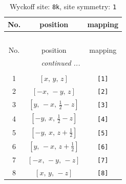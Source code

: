 \documentclass[fleqn,8pt]{jsarticle}
\begin{document}
\renewcommand{\arraystretch}{1.2}
\begin{longtable}{ccc}
\caption{Wyckoff site: {\tt 8k}, site symmetry: {\tt 1}}
 \\
 \hline \hline
No. & position & mapping \\ \hline \endfirsthead

\multicolumn{2}{l}{\tablename\ \thetable{}} \\
 \hline \hline
No. & position & mapping \\ \hline \endhead

 \hline \hline
\multicolumn{2}{r}{\footnotesize\it continued ...} \\ \endfoot

 \hline \hline
\multicolumn{2}{r}{} \\ \endlastfoot

1 & $\left[ x,\, y,\, z \right]$ & {\tt [1]} \\ \hline
2 & $\left[ - x,\, - y,\, z \right]$ & {\tt [2]} \\ \hline
3 & $\left[ y,\, - x,\, \frac{1}{2} - z \right]$ & {\tt [3]} \\ \hline
4 & $\left[ - y,\, x,\, \frac{1}{2} - z \right]$ & {\tt [4]} \\ \hline
5 & $\left[ - y,\, x,\, z + \frac{1}{2} \right]$ & {\tt [5]} \\ \hline
6 & $\left[ y,\, - x,\, z + \frac{1}{2} \right]$ & {\tt [6]} \\ \hline
7 & $\left[ - x,\, - y,\, - z \right]$ & {\tt [7]} \\ \hline
8 & $\left[ x,\, y,\, - z \right]$ & {\tt [8]} \\
\end{longtable}
\end{document}
